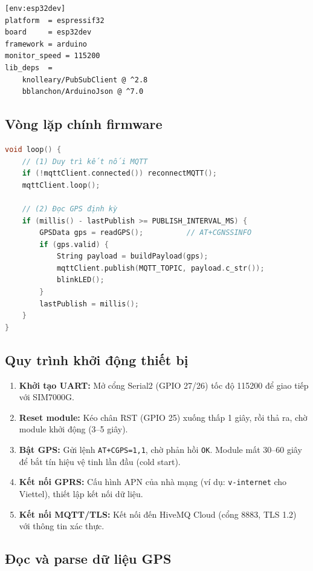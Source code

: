 \begin{lstlisting}[language=bash, caption=platformio.ini]
[env:esp32dev]
platform  = espressif32
board     = esp32dev
framework = arduino
monitor_speed = 115200
lib_deps  =
    knolleary/PubSubClient @ ^2.8
    bblanchon/ArduinoJson @ ^7.0
\end{lstlisting}

\subsection{Vòng lặp chính firmware}

\begin{lstlisting}[language=C++, caption=Vòng lặp chính main.cpp (rút gọn)]
void loop() {
    // (1) Duy trì kết nối MQTT
    if (!mqttClient.connected()) reconnectMQTT();
    mqttClient.loop();

    // (2) Đọc GPS định kỳ
    if (millis() - lastPublish >= PUBLISH_INTERVAL_MS) {
        GPSData gps = readGPS();          // AT+CGNSSINFO
        if (gps.valid) {
            String payload = buildPayload(gps);
            mqttClient.publish(MQTT_TOPIC, payload.c_str());
            blinkLED();
        }
        lastPublish = millis();
    }
}
\end{lstlisting}

\subsection{Quy trình khởi động thiết bị}

\begin{enumerate}
  \item \textbf{Khởi tạo UART:} Mở cổng Serial2 (GPIO 27/26) tốc độ 115200 để giao tiếp với SIM7000G.
  \item \textbf{Reset module:} Kéo chân RST (GPIO 25) xuống thấp 1 giây, rồi thả ra, chờ module khởi động (3--5 giây).
  \item \textbf{Bật GPS:} Gửi lệnh \texttt{AT+CGPS=1,1}, chờ phản hồi \texttt{OK}. Module mất 30--60 giây để bắt tín hiệu vệ tinh lần đầu (cold start).
  \item \textbf{Kết nối GPRS:} Cấu hình APN của nhà mạng (ví dụ: \texttt{v-internet} cho Viettel), thiết lập kết nối dữ liệu.
  \item \textbf{Kết nối MQTT/TLS:} Kết nối đến HiveMQ Cloud (cổng 8883, TLS 1.2) với thông tin xác thực.
\end{enumerate}

\subsection{Đọc và parse dữ liệu GPS}

